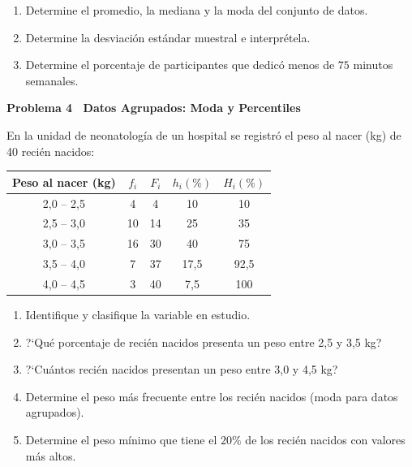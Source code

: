 \documentclass[10pt,letterpaper]{article}
\newcommand{\seccion}[1]{%
  \vspace{2pt}%
  \begin{tcolorbox}[enhanced,colback=white,colframe=black,arc=0pt,boxrule=0pt,
    leftrule=2pt,left=6pt,right=6pt,top=1pt,bottom=1pt]
    {\normalsize\bfseries\sffamily #1}
  \end{tcolorbox}%
  \vspace{1pt}%
}
\begin{document}
\begin{enumerate}[leftmargin=1.2cm, label=\textbf{\alph*)}, itemsep=2pt, topsep=2pt]
  \item Determine el promedio, la mediana y la moda del conjunto de datos.
  \item Determine la desviaci\'on est\'andar muestral e interpr\'etela.
  \item Determine el porcentaje de participantes que dedic\'o menos de $75$ minutos semanales.
\end{enumerate}

\seccion{Problema 4 \textendash\ Datos Agrupados: Moda y Percentiles}

\noindent\sffamily\small En la unidad de neonatolog\'ia de un hospital se registr\'o el peso al nacer (kg) de 40 reci\'en nacidos:

\vspace{4pt}
\begin{center}
\small\sffamily
\begin{tabular}{|c|c|c|c|c|}
\hline
\textbf{Peso al nacer (kg)} & $f_i$ & $F_i$ & $h_i(\%)$ & $H_i(\%)$ \\
\hline
2{,}0 -- 2{,}5 & 4  & 4  & 10    & 10    \\
\hline
2{,}5 -- 3{,}0 & 10 & 14 & 25    & 35    \\
\hline
3{,}0 -- 3{,}5 & 16 & 30 & 40    & 75    \\
\hline
3{,}5 -- 4{,}0 & 7  & 37 & 17{,}5  & 92{,}5  \\
\hline
4{,}0 -- 4{,}5 & 3  & 40 & 7{,}5   & 100   \\
\hline
\end{tabular}
\end{center}
\vspace{4pt}

\begin{enumerate}[leftmargin=1.2cm, label=\textbf{\alph*)}, itemsep=2pt, topsep=2pt]
  \item Identifique y clasifique la variable en estudio.
  \item ?`Qu\'e porcentaje de reci\'en nacidos presenta un peso entre 2{,}5 y 3{,}5 kg?
  \item ?`Cu\'antos reci\'en nacidos presentan un peso entre 3{,}0 y 4{,}5 kg?
  \item Determine el peso m\'as frecuente entre los reci\'en nacidos (moda para datos agrupados).
  \item Determine el peso m\'inimo que tiene el $20\%$ de los reci\'en nacidos con valores m\'as altos.
\end{enumerate}
\end{document}
